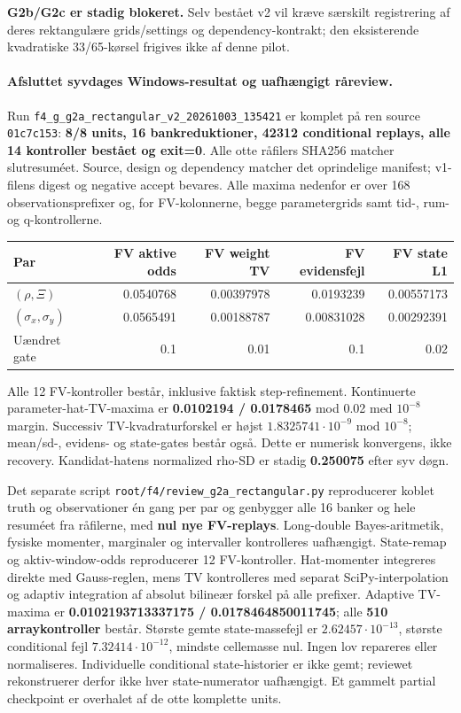 \textbf{G2b/G2c er stadig blokeret.} Selv bestået v2 vil kræve særskilt
registrering af deres rektangulære grids/settings og dependency-kontrakt;
den eksisterende kvadratiske 33/65-kørsel frigives ikke af denne pilot.

\paragraph{Afsluttet syvdages Windows-resultat og uafhængigt råreview.}
Run \texttt{f4\_\allowbreak{}g\_\allowbreak{}g2a\_\allowbreak{}rectangular\_\allowbreak{}v2\_\allowbreak{}20261003\_135421} er komplet på
ren source \texttt{01c7c153}: \textbf{8/8 units, 16 bankreduktioner,
42312 conditional replays, alle 14 kontroller bestået og exit=0}.
Alle otte råfilers SHA256 matcher slutresuméet. Source, design og dependency
matcher det oprindelige manifest; v1-filens digest og negative accept bevares.
Alle maxima nedenfor er over 168 observationsprefixer og, for FV-kolonnerne,
begge parametergrids samt tid-, rum- og q-kontrollerne.

\begin{center}\small
\begin{tabular}{lrrrr}
\toprule
Par & FV aktive odds & FV weight TV & FV evidensfejl & FV state L1 \\
\midrule
$(\rho,\Xi)$ & 0.0540768 & 0.00397978 & 0.0193239 & 0.00557173 \\
$(\sigma_x,\sigma_y)$ & 0.0565491 & 0.00188787 & 0.00831028 & 0.00292391 \\
Uændret gate & 0.1 & 0.01 & 0.1 & 0.02 \\
\bottomrule
\end{tabular}\end{center}

Alle 12 FV-kontroller består, inklusive faktisk step-refinement.
Kontinuerte parameter-hat-TV-maxima er \textbf{0.0102194 / 0.0178465}
mod 0.02 med $10^{-8}$ margin. Successiv TV-kvadraturforskel er højst
$1.8325741\cdot10^{-9}$ mod $10^{-8}$; mean/sd-, evidens- og state-gates
består også. Dette er numerisk konvergens, ikke recovery. Kandidat-hatens
normalized rho-SD er stadig \textbf{0.250075} efter syv døgn.

Det separate script
\texttt{root/f4/review\_g2a\_rectangular.py} reproducerer koblet truth og
observationer én gang per par og genbygger alle 16 banker og hele resuméet
fra råfilerne, med \textbf{nul nye FV-replays}. Long-double Bayes-aritmetik,
fysiske momenter, marginaler og intervaller kontrolleres uafhængigt.
State-remap og aktiv-window-odds reproducerer 12 FV-kontroller.
Hat-momenter integreres direkte med Gauss-reglen, mens TV kontrolleres
med separat SciPy-interpolation og adaptiv integration af absolut bilineær
forskel på alle prefixer. Adaptive TV-maxima er
\textbf{0.0102193713337175 / 0.0178464850011745}; alle \textbf{510 arraykontroller}
består. Største gemte state-massefejl er $2.62457\cdot10^{-13}$,
største conditional fejl $7.32414\cdot10^{-12}$, mindste cellemasse nul.
Ingen lov repareres eller normaliseres. Individuelle conditional state-historier
er ikke gemt; reviewet rekonstruerer derfor ikke hver state-numerator
uafhængigt. Et gammelt partial checkpoint er overhalet af de otte komplette units.

